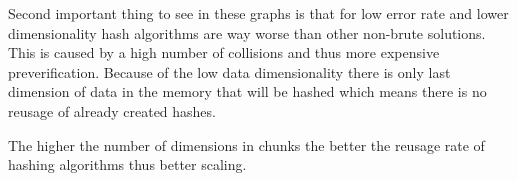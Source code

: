 Second important thing to see in these graphs is that for low error rate and lower dimensionality hash algorithms are way worse than other non-brute solutions. This is caused by a high number of collisions and thus more expensive preverification. Because of the low data dimensionality there is only last dimension of data in the memory that will be hashed which means there is no reusage of already created hashes.

The higher the number of dimensions in chunks the better the reusage rate of hashing algorithms thus better scaling.

\begin{figure}
\begin{minipage}{\linewidth}
\centering
{}
\end{minipage}\par\medskip

\begin{minipage}{.5\linewidth}
\centering
{}
\end{minipage}%
\begin{minipage}{.5\linewidth}
\centering
{}
\end{minipage}\par\medskip


\end{figure}

